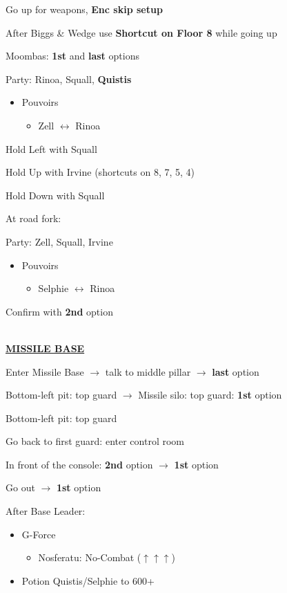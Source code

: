 Go up for weapons, \textbf{Enc skip setup}

After Biggs \& Wedge use \textbf{Shortcut on Floor 8} while going up

Moombas: \textbf{1st} and \textbf{last} options

Party: Rinoa, Squall, \textbf{Quistis}
\begin{itemize}
	\item Pouvoirs
		\begin{itemize}
			\item Zell $\leftrightarrow$ Rinoa
		\end{itemize}
\end{itemize}

Hold Left with Squall

Hold Up with Irvine (shortcuts on 8, 7, 5, 4)

Hold Down with Squall

At road fork:

Party: Zell, Squall, Irvine
\begin{itemize}
	\item Pouvoirs
		\begin{itemize}
			\item Selphie $\leftrightarrow$ Rinoa
		\end{itemize}
\end{itemize}

Confirm with \textbf{2nd} option

\leavevmode\\
\underline{\textbf{MISSILE BASE}}

Enter Missile Base $\rightarrow$ talk to middle pillar $\rightarrow$ \textbf{last} option

Bottom-left pit: top guard $\rightarrow$ Missile silo: top guard: \textbf{1st} option

Bottom-left pit: top guard

Go back to first guard: enter control room

In front of the console: \textbf{2nd} option $\rightarrow$ \textbf{1st} option

Go out $\rightarrow$ \textbf{1st} option

After Base Leader:
\begin{menu}
	\begin{itemize}
		\item G-Force
			\begin{itemize}
				\item Nosferatu: No-Combat ($\uparrow\uparrow\uparrow$)
			\end{itemize}
		\item Potion Quistis/Selphie to 600+
	\end{itemize}
\end{menu}

